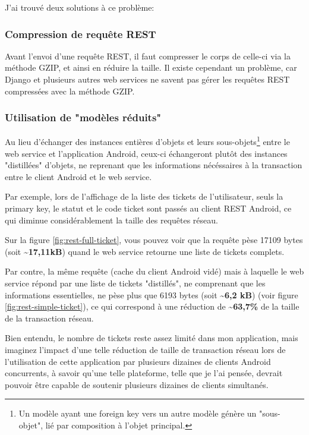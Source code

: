 \documentclass[12pt,table,a4paper]{report}
\begin{document}
J'ai trouvé deux solutions à ce problème:


\subsubsection{Compression de requête REST}
Avant l'envoi d'une requête REST, il faut compresser le corps de celle-ci via la méthode GZIP, et ainsi en réduire la taille. Il existe cependant un problème, car Django et plusieurs autres web services ne savent pas gérer les requêtes REST compressées avec la méthode GZIP.


\subsubsection{Utilisation de "modèles réduits"}
Au lieu d'échanger des instances entières d'objets et leurs sous-objets\footnote{Un modèle ayant une foreign key vers un autre modèle génère un "sous-objet", lié par composition à l'objet principal.} entre le web service et l'application Android, ceux-ci échangeront plutôt des instances "distillées" d'objets, ne reprenant que les informations nécéssaires à la transaction entre le client Android et le web service.

Par exemple, lors de l'affichage de la liste des tickets de l'utilisateur, seuls la primary key, le statut et le code ticket sont passés au client REST Android, ce qui diminue considérablement la taille des requêtes réseau.

Sur la figure \ref{fig:rest-full-ticket}, vous pouvez voir que la requête pèse 17109 bytes (soit \textbf{\textasciitilde17,11kB}) quand le web service retourne une liste de tickets complets. 

Par contre, la même requête (cache du client Android vidé) mais à laquelle le web service répond par une liste de tickets "distillés", ne comprenant que les informations essentielles, ne pèse plus que 6193 bytes (soit \textbf{\textasciitilde6,2 kB}) (voir figure \ref{fig:rest-simple-ticket}), ce qui correspond à une réduction de \textbf{\textasciitilde63,7\%} de la taille de la transaction réseau.

Bien entendu, le nombre de tickets reste assez limité dans mon application, mais imaginez l'impact d'une telle réduction de taille de transaction réseau lors de l'utilisation de cette application par plusieurs dizaines de clients Android concurrents, à savoir qu'une telle plateforme, telle que je l'ai pensée, devrait pouvoir être capable de soutenir plusieurs dizaines de clients simultanés.
\end{document}
